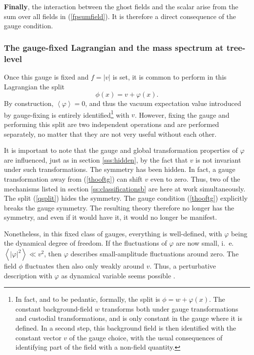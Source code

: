 \documentclass[final,12pt]{article}
\newcommand*{\no}{\noindent}
\newcommand*{\be}{\begin{equation}}
\newcommand*{\ee}{\end{equation}}
\newcommand*{\pref}[1]{(\ref{#1})}
\newcommand*{\1}{1\!\!\!\bot}
\newcommand*{\la}{\left\langle}
\newcommand*{\ra}{\right\rangle}
\begin{document}
{\bf Finally}, the interaction between the ghost fields and the scalar arise from the sum over all fields in \pref{fpsumfield}. It is therefore a direct consequence of the gauge condition.

\subsubsection{The gauge-fixed Lagrangian and the mass spectrum at tree-level}

Once this gauge is fixed and $f=|v|$ is set, it is common to perform in this Lagrangian the split \cite{Lee:1974zg,Bohm:2001yx}
\be
\phi(x)=v+\varphi(x)\label{qsplit}.
\ee
\no By construction, $\la\varphi\ra=0$, and thus the vacuum expectation value introduced by gauge-fixing is entirely identified\footnote{In fact, and to be pedantic, formally, the split is $\phi=w+\varphi(x)$. The constant background-field $w$ transforms both under gauge transformations and custodial transformations, and is only constant in the gauge where it is defined. In a second step, this background field is then identified with the constant vector $v$ of the gauge choice, with the usual consequences of identifying part of the field with a non-field quantity.} with $v$. However, fixing the gauge and performing this split are two independent operations and are performed separately, no matter that they are not very useful without each other.

It is important to note that the gauge and global transformation properties of $\varphi$ are influenced, just as in section \ref{sss:hidden}, by the fact that $v$ is not invariant under such transformations. The symmetry has been hidden. In fact, a gauge transformation away from \pref{thooftg} can shift $v$ even to zero. Thus, two of the mechanisms listed in section \ref{ss:classificationsb} are here at work simultaneously. The split \pref{qsplit} hides the symmetry. The gauge condition \pref{thooftg} explicitly breaks the gauge symmetry. The resulting theory therefore no longer has the symmetry, and even if it would have it, it would no longer be manifest.

Nonetheless, in this fixed class of gauges, everything is well-defined, with $\varphi$ being the dynamical degree of freedom. If the fluctuations of $\varphi$ are now small, i.\ e.\ $\la|\varphi|^2\ra\ll v^2$, then $\varphi$ describes small-amplitude fluctuations around zero. The field $\phi$ fluctuates then also only weakly around $v$. Thus, a perturbative description with $\varphi$ as dynamical variable seems possible \cite{Lee:1974zg,Damgaard:1985nb,Bohm:2001yx}.
\end{document}
